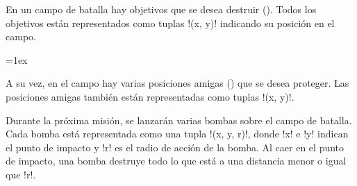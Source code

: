 En un campo de batalla
hay objetivos que se desea destruir (\frownie).
Todos los objetivos están representados
como tuplas \li!(x, y)!
indicando su posición en el campo.

\begin{minipage}{0.65\textwidth}
  \parskip=1ex

  A su vez,
  en el campo hay varias posiciones amigas (\smiley)
  que se desea proteger.
  Las posiciones amigas también están representadas
  como tuplas \li!(x, y)!.

  Durante la próxima misión,
  se lanzarán varias bombas sobre el campo de batalla.
  Cada bomba está representada
  como una tupla \li!(x, y, r)!,
  donde \li!x! e \li!y! indican el punto de impacto
  y \li!r! es el radio de acción de la bomba.
  Al caer en el punto de impacto,
  una bomba destruye todo lo que está
  a una distancia menor o igual que \li!r!.
\end{minipage}
\hfill
\begin{minipage}{.25\textwidth}
  \hfill
\end{minipage}


